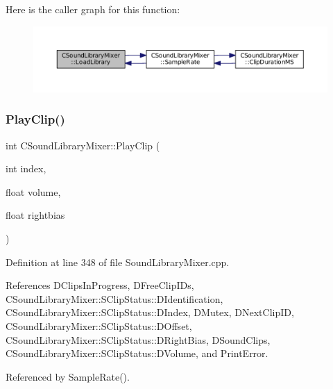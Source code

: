 Here is the caller graph for this function\+:\nopagebreak
\begin{figure}[H]
\begin{center}
\leavevmode
\includegraphics[width=350pt]{classCSoundLibraryMixer_a9753684f44863e3c7cc4d319370cda1d_icgraph}
\end{center}
\end{figure}
\hypertarget{classCSoundLibraryMixer_a9af6d9e3dacf63b07a7ad75e629bdc2f}{}\label{classCSoundLibraryMixer_a9af6d9e3dacf63b07a7ad75e629bdc2f} 
\subsubsection{\texorpdfstring{Play\+Clip()}{PlayClip()}}
{\footnotesize\ttfamily int C\+Sound\+Library\+Mixer\+::\+Play\+Clip (\begin{DoxyParamCaption}\item[{int}]{index,  }\item[{float}]{volume,  }\item[{float}]{rightbias }\end{DoxyParamCaption})}



Definition at line 348 of file Sound\+Library\+Mixer.\+cpp.



References D\+Clips\+In\+Progress, D\+Free\+Clip\+I\+Ds, C\+Sound\+Library\+Mixer\+::\+S\+Clip\+Status\+::\+D\+Identification, C\+Sound\+Library\+Mixer\+::\+S\+Clip\+Status\+::\+D\+Index, D\+Mutex, D\+Next\+Clip\+ID, C\+Sound\+Library\+Mixer\+::\+S\+Clip\+Status\+::\+D\+Offset, C\+Sound\+Library\+Mixer\+::\+S\+Clip\+Status\+::\+D\+Right\+Bias, D\+Sound\+Clips, C\+Sound\+Library\+Mixer\+::\+S\+Clip\+Status\+::\+D\+Volume, and Print\+Error.



Referenced by Sample\+Rate().


